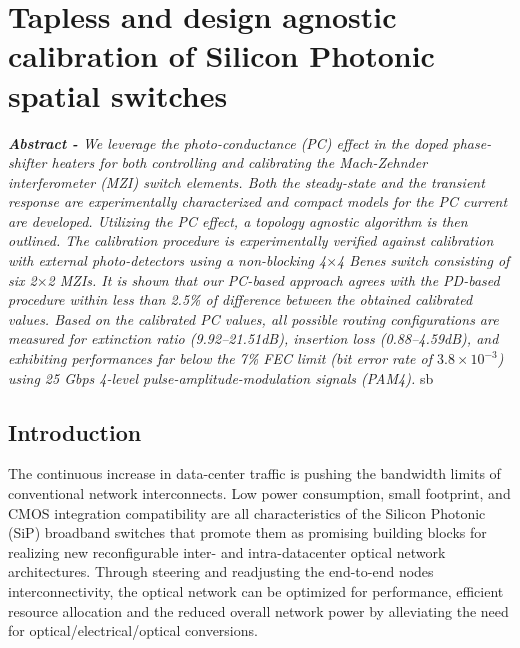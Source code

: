 
\pagestyle{plain}

\chapter[Tapless and design agnostic Silicon Photonic spatial switches][Top of Page Title]{Tapless and design agnostic calibration of Silicon Photonic spatial switches}

\textit{\textbf{Abstract - }We leverage the photo-conductance (PC) effect in the doped phase-shifter heaters for both controlling and calibrating the Mach-Zehnder interferometer (MZI) switch elements. Both the steady-state and the transient response are experimentally characterized and compact models for the PC current are developed. Utilizing the PC effect, a topology agnostic algorithm is then outlined. The calibration procedure is experimentally verified against calibration with external photo-detectors using a non-blocking 4$\times$4 Benes switch consisting of six 2$\times$2 MZIs. It is shown that our PC-based approach agrees with the PD-based procedure within less than 2.5\% of difference between the obtained calibrated values. Based on the calibrated PC values, all possible routing configurations are measured for extinction ratio (9.92--21.51dB), insertion loss (0.88--4.59dB), and exhibiting performances far below the 7\% FEC limit (bit error rate of $3.8\times 10^{-3}$) using 25 Gbps 4-level pulse-amplitude-modulation signals (PAM4).}
 sb

\section{Introduction}

The continuous increase in data-center traffic is pushing the bandwidth limits of conventional network interconnects\cite{Cisco_whitePaper}. Low power consumption, small footprint, and CMOS integration compatibility are all characteristics of the Silicon Photonic (SiP) broadband switches that promote them as promising building blocks for realizing new reconfigurable inter- and intra-datacenter optical network architectures\cite{Cheng_DC}. Through steering and readjusting the end-to-end nodes interconnectivity\cite{Shen_ResourceUtilization}, the optical network can be optimized for performance\cite{Wen_DC}, efficient resource allocation\cite{Chen_OSA} and the reduced overall network power by alleviating the need for optical/electrical/optical conversions\cite{Shalf_lowEnergy}. 

